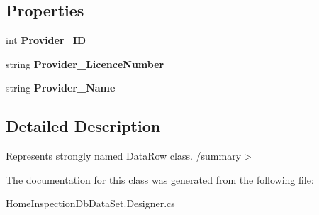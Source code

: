 \subsection*{Properties}
\begin{DoxyCompactItemize}
\item 
\mbox{\label{class_a_f_h___scheduler_1_1_home_inspection_db_data_set_1_1_provider_row_afcc583d135227ac209c6e6255f9ca2f8}} 
int {\bfseries Provider\+\_\+\+ID}\hspace{0.3cm}{\ttfamily  [get, set]}
\item 
\mbox{\label{class_a_f_h___scheduler_1_1_home_inspection_db_data_set_1_1_provider_row_a9c8a28cef0f8100883da62d57dab81f4}} 
string {\bfseries Provider\+\_\+\+Licence\+Number}\hspace{0.3cm}{\ttfamily  [get, set]}
\item 
\mbox{\label{class_a_f_h___scheduler_1_1_home_inspection_db_data_set_1_1_provider_row_a78e408644810033da81c1f1b5799e78c}} 
string {\bfseries Provider\+\_\+\+Name}\hspace{0.3cm}{\ttfamily  [get, set]}
\end{DoxyCompactItemize}


\subsection{Detailed Description}
Represents strongly named Data\+Row class. /summary$>$ 

The documentation for this class was generated from the following file\+:\begin{DoxyCompactItemize}
\item 
Home\+Inspection\+Db\+Data\+Set.\+Designer.\+cs\end{DoxyCompactItemize}

